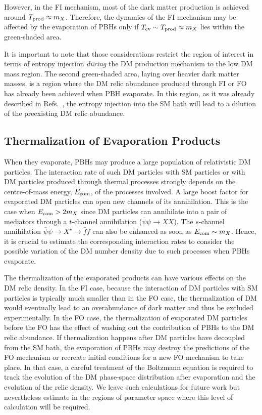 \documentclass[aps,prd,reprint,twocolumn,preprintnumbers,floatfix,nofootinbib]{revtex4-1}
\begin{document}
However, in the FI mechanism, most of the dark matter production is achieved around $T_{\rm prod}\approx m_X$. Therefore, the dynamics of the FI mechanism may be affected by the evaporation of PBHs only if $T_{\rm ev}\sim T_{\rm prod}\approx m_X$ lies within the green-shaded area. 

It is important to note that those considerations restrict the region of interest in terms of entropy injection {\em during} the DM production mechanism to the low DM mass region. The second green-shaded area, laying over heavier dark matter masses, is a region where the DM relic abundance produced through FI or FO has already been achieved when PBH evaporate. In this region, as it was already described in Refs.~\cite{Bernal:2020bjf, Gondolo:2020uqv}, the entropy injection into the SM bath will lead to a dilution of the preexisting DM relic abundance.

\subsection{Thermalization of Evaporation Products}\label{sec:thermevap}

When they evaporate, PBHs may produce a large population of relativistic DM particles. The interaction rate of such DM particles with SM particles or with DM particles produced through thermal processes strongly depends on the centre-of-mass energy, $E_{\rm com}$, of the processes involved. A large boost factor for evaporated DM particles can open new channels of its annihilation. This is the case when $E_{\rm com}>2 m_X$ since DM particles can annihilate into a pair of mediators through a $t$-channel annihilation ($\bar\psi\psi\to XX$). The $s$-channel annihilation $\bar\psi\psi\to X^\star \to \bar ff$ can also be enhanced as soon as $E_{\rm com}\sim m_X$. Hence, it is crucial to estimate the corresponding interaction rates to consider the possible variation of the DM number density due to such processes when PBHs evaporate.

The thermalization of the evaporated products can have various effects on the DM relic density. In the FI case, because the interaction of DM particles with SM particles is typically much smaller than in the FO case, the thermalization of DM would eventually lead to an overabundance of dark matter and thus be excluded experimentally. In the FO case, the thermalization of evaporated DM particles before the FO has the effect of washing out the contribution of PBHs to the DM relic abundance. If thermalization happens after DM particles have decoupled from the SM bath, the evaporation of PBHs may destroy the predictions of the FO mechanism or recreate initial conditions for a new FO mechanism to take place. In that case, a careful treatment of the Boltzmann equation is required to track the evolution of the DM phase-space distribution after evaporation and the evolution of the relic density. We leave such calculations for future work but nevertheless estimate in the regions of parameter space where this level of calculation will be required.
\end{document}

